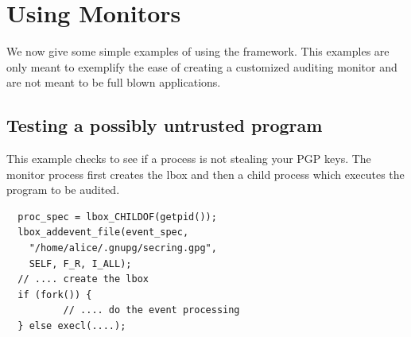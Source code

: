 


\section{Using Monitors}

We now give some simple examples of using the framework.
This examples are only meant to exemplify the ease of creating
a customized auditing monitor and are not meant to be full blown applications.

\subsection{Testing a possibly untrusted program}

This example checks to see if a process is not stealing your PGP keys.
The monitor process first creates the lbox and then a child process
which executes the program to be audited.

{
\small
\begin{verbatim}
  proc_spec = lbox_CHILDOF(getpid());
  lbox_addevent_file(event_spec,
    "/home/alice/.gnupg/secring.gpg",
    SELF, F_R, I_ALL);
  // .... create the lbox
  if (fork()) {
          // .... do the event processing
  } else execl(....);
\end{verbatim}
}

